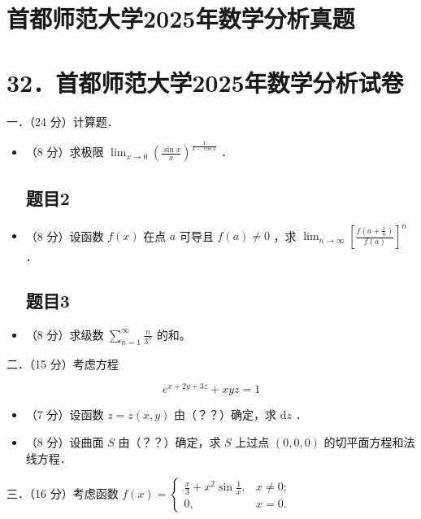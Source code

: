 \documentclass{article}
\begin{document}
\section*{首都师范大学2025年数学分析真题}
\section*{32．首都师范大学2025年数学分析试卷}
一．（24 分）计算题．

\begin{itemize}

\subsection{题目1}
  \item[1．] （8 分）求极限 \(\lim _{x \rightarrow 0}\left(\frac{\sin x}{x}\right)^{\frac{1}{1-\cos x}}\) ．

\subsection{题目2}
  \item[2．] （8 分）设函数 \(f(x)\) 在点 \(a\) 可导且 \(f(a) \neq 0\) ，求 \(\lim _{n \rightarrow \infty}\left[\frac{f\left(a+\frac{1}{n}\right)}{f(a)}\right]^{n}\) ．

\subsection{题目3}
  \item[3．] （8 分）求级数 \(\sum_{n=1}^{\infty} \frac{n}{3^{n}}\) 的和。
\end{itemize}

二．（15 分）考虑方程

\[
e^{x+2 y+3 z}+x y z=1
\]

\begin{itemize}

  \item[1．] （7 分）设函数 \(z=z(x, y)\) 由（？？）确定，求 \(\mathrm{d} z\) ．

  \item[2．] （8 分）设曲面 \(S\) 由（？？）确定，求 \(S\) 上过点 \((0,0,0)\) 的切平面方程和法线方程．
\end{itemize}

三．（16 分）考虑函数 \(f(x)= \begin{cases}\frac{x}{3}+x^{2} \sin \frac{1}{x}, & x \neq 0 ; \\ 0, & x=0 .\end{cases}\)\\
\end{document}
